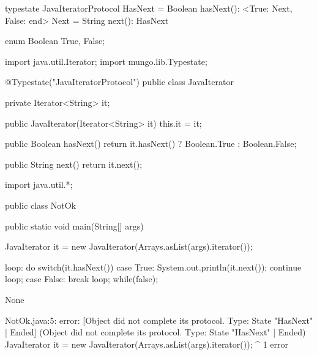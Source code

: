 \begin{code}
typestate JavaIteratorProtocol {
  HasNext = {
    Boolean hasNext(): <True: Next, False: end>
  }
  Next = {
    String next(): HasNext
  }
}\end{code}

\begin{code}
enum Boolean {
	True, False;
}\end{code}

\begin{code}
import java.util.Iterator;
import mungo.lib.Typestate;

@Typestate("JavaIteratorProtocol")
public class JavaIterator {

  private Iterator<String> it;

  public JavaIterator(Iterator<String> it) {
    this.it = it;
  }

	public Boolean hasNext() {
    return it.hasNext() ? Boolean.True : Boolean.False;
  }

  public String next() {
    return it.next();
  }

}\end{code}

\begin{code}
import java.util.*;

public class NotOk {
	public static void main(String[] args) {
		JavaIterator it = new JavaIterator(Arrays.asList(args).iterator());

    loop: do {
      switch(it.hasNext()) {
        case True:
          System.out.println(it.next());
          continue loop;
        case False:
          break loop;
      }
    } while(false);
	}
}\end{code}

\lstset{language=,caption=Mungo's output}
\begin{code}
None
\end{code}

\lstset{language=,caption=Our tool's output}
\begin{code}
NotOk.java:5: error: [Object did not complete its protocol. Type: State "HasNext" | Ended] (Object did not complete its protocol. Type: State "HasNext" | Ended)
		JavaIterator it = new JavaIterator(Arrays.asList(args).iterator());
		             ^
1 error
\end{code}

